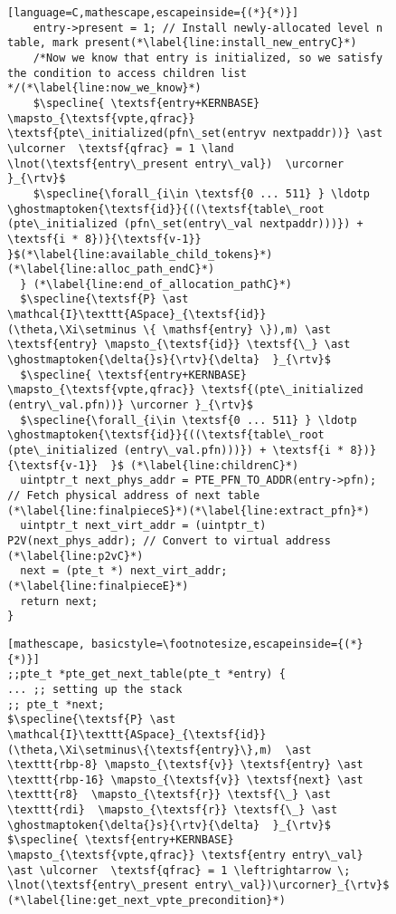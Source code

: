 \begin{figure}
\begin{lstlisting}[language=C,mathescape,escapeinside={(*}{*)}]
    entry->present = 1; // Install newly-allocated level n table, mark present(*\label{line:install_new_entryC}*)
    /*Now we know that entry is initialized, so we satisfy the condition to access children list */(*\label{line:now_we_know}*)
    $\specline{ \textsf{entry+KERNBASE} \mapsto_{\textsf{vpte,qfrac}}  \textsf{pte\_initialized(pfn\_set(entryv nextpaddr))} \ast \ulcorner  \textsf{qfrac} = 1 \land \lnot(\textsf{entry\_present entry\_val})  \urcorner }_{\rtv}$
    $\specline{\forall_{i\in \textsf{0 ... 511} } \ldotp  \ghostmaptoken{\textsf{id}}{((\textsf{table\_root (pte\_initialized (pfn\_set(entry\_val nextpaddr)))}) + \textsf{i * 8})}{\textsf{v-1}}  }$(*\label{line:available_child_tokens}*) (*\label{line:alloc_path_endC}*)
  } (*\label{line:end_of_allocation_pathC}*)
  $\specline{\textsf{P} \ast \mathcal{I}\texttt{ASpace}_{\textsf{id}}(\theta,\Xi\setminus \{ \mathsf{entry} \}),m) \ast \textsf{entry} \mapsto_{\textsf{id}} \textsf{\_} \ast \ghostmaptoken{\delta{}s}{\rtv}{\delta}  }_{\rtv}$
  $\specline{ \textsf{entry+KERNBASE} \mapsto_{\textsf{vpte,qfrac}} \textsf{(pte\_initialized (entry\_val.pfn))} \urcorner }_{\rtv}$
  $\specline{\forall_{i\in \textsf{0 ... 511} } \ldotp  \ghostmaptoken{\textsf{id}}{((\textsf{table\_root (pte\_initialized (entry\_val.pfn)))}) + \textsf{i * 8})}{\textsf{v-1}}  }$ (*\label{line:childrenC}*)
  uintptr_t next_phys_addr = PTE_PFN_TO_ADDR(entry->pfn); // Fetch physical address of next table (*\label{line:finalpieceS}*)(*\label{line:extract_pfn}*)
  uintptr_t next_virt_addr = (uintptr_t) P2V(next_phys_addr); // Convert to virtual address (*\label{line:p2vC}*)
  next = (pte_t *) next_virt_addr;(*\label{line:finalpieceE}*)
  return next;
}
\end{lstlisting}
\else
\begin{lstlisting}[mathescape, basicstyle=\footnotesize,escapeinside={(*}{*)}]
;;pte_t *pte_get_next_table(pte_t *entry) {
... ;; setting up the stack
;; pte_t *next;
$\specline{\textsf{P} \ast \mathcal{I}\texttt{ASpace}_{\textsf{id}}(\theta,\Xi\setminus\{\textsf{entry}\},m)  \ast \texttt{rbp-8} \mapsto_{\textsf{v}} \textsf{entry} \ast  \texttt{rbp-16} \mapsto_{\textsf{v}} \textsf{next} \ast \texttt{r8}  \mapsto_{\textsf{r}} \textsf{\_} \ast \texttt{rdi}  \mapsto_{\textsf{r}} \textsf{\_} \ast \ghostmaptoken{\delta{}s}{\rtv}{\delta}  }_{\rtv}$
$\specline{ \textsf{entry+KERNBASE} \mapsto_{\textsf{vpte,qfrac}} \textsf{entry entry\_val} \ast \ulcorner  \textsf{qfrac} = 1 \leftrightarrow \; \lnot(\textsf{entry\_present entry\_val})\urcorner}_{\rtv}$ (*\label{line:get_next_vpte_precondition}*)

\end{lstlisting}
\end{figure}
